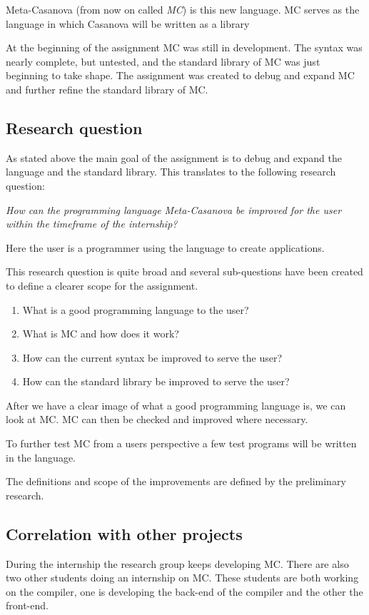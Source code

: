 Meta-Casanova (from now on called \emph{MC}) is this new language.
MC serves as the language in which Casanova will be written as a library

At the beginning of the assignment MC was still in development.
The syntax was nearly complete, but untested, and the standard library of MC was just beginning to take shape.
The assignment was created to debug and expand MC and further refine the standard library of MC.


\subsection{Research question}
As stated above the main goal of the assignment is to debug and expand the language and the standard library.
This translates to the following research question:

\emph{How can the programming language Meta-Casanova be improved for the user within the timeframe of the internship?}

Here the user is a programmer using the language to create applications.

This research question is quite broad and several sub-questions have been created to define a clearer scope for the assignment.

\begin{enumerate}[noitemsep]
   \item What is a good programming language to the user?
   \item What is MC and how does it work?
   \item How can the current syntax be improved to serve the user?
   \item How can the standard library be improved to serve the user?
\end{enumerate}

After we have a clear image of what a good programming language is, we can look at MC.
MC can then be checked and improved where necessary.

To further test MC from a users perspective a few test programs will be written in the language.

The definitions and scope of the improvements are defined by the preliminary research.


\subsection{Correlation with other projects}
During the internship the research group keeps developing MC.
There are also two other students doing an internship on MC.
These students are both working on the compiler, one is developing the back-end of the compiler and the other the front-end.

